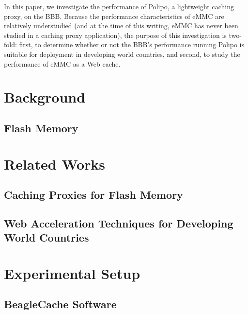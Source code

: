 \documentclass[pageno]{jpaper}
\begin{document}
In this paper, we investigate the performance of Polipo\cite{polipo}, a lightweight caching proxy, on the BBB.  Because the performance characteristics of eMMC are relatively understudied (and at the time of this writing, eMMC has never been studied in a caching proxy application), the purpose of this investigation is two-fold: first, to determine whether or not the BBB's performance running Polipo is suitable for deployment in developing world countries, and second, to study the performance of eMMC as a Web cache. 

\section{Background}

\subsection{Flash Memory}

\section{Related Works}
\subsection{Caching Proxies for Flash Memory}
\subsection{Web Acceleration Techniques for Developing World Countries}

\section{Experimental Setup}

\subsection{BeagleCache Software}
\end{document}
